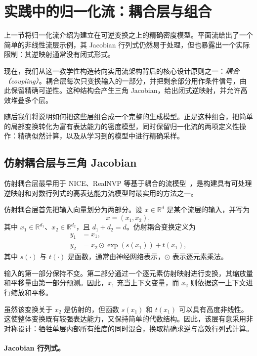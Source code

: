 \section{实践中的归一化流：耦合层与组合}

上一节将归一化流介绍为建立在可逆变换之上的精确密度模型。平面流给出了一个简单的非线性流层示例，其 Jacobian 行列式仍然易于处理，但也暴露出一个实际限制：其逆映射通常没有闭式形式。

现在，我们从这一教学性构造转向实用流架构背后的核心设计原则之一：\emph{耦合（coupling）}。耦合层每次只变换输入的一部分，并把剩余部分用作条件信号，由此保留精确可逆性。这种结构会产生三角 Jacobian，给出闭式逆映射，并允许高效堆叠多个层。

随后我们将说明如何把这些层组合成一个完整的生成模型。正是这种组合，把简单的局部变换转化为富有表达能力的密度模型，同时保留归一化流的两项定义性操作：精确似然计算，以及从学习到的模型中进行精确采样。

\subsection{仿射耦合层与三角 Jacobian}

仿射耦合层最早用于 NICE、RealNVP 等基于耦合的流模型~\cite{dinh2014nice,dinh2017density}，是构建具有可处理逆映射和对数行列式的高表达能力流模型时最实用的方法之一。

仿射耦合层首先把输入向量划分为两部分。设 $x\in\mathbb{R}^d$ 是某个流层的输入，并写为
\[
x=(x_1,x_2),
\]
其中 $x_1\in\mathbb{R}^{d_1}$、$x_2\in\mathbb{R}^{d_2}$，且 $d_1+d_2=d$。仿射耦合变换定义为
\[
\begin{aligned}
y_1 &= x_1,\\
y_2 &= x_2\odot \exp(s(x_1)) + t(x_1),
\end{aligned}
\]
其中 $s(\cdot)$ 与 $t(\cdot)$ 是函数，通常由神经网络表示，$\odot$ 表示逐元素乘法。

输入的第一部分保持不变。第二部分通过一个逐元素仿射映射进行变换，其缩放量和平移量由第一部分预测。因此，$x_1$ 充当上下文变量，而 $x_2$ 则依据这一上下文进行缩放和平移。

虽然该变换关于 $x_2$ 是仿射的，但函数 $s(x_1)$ 和 $t(x_1)$ 可以具有高度非线性。这使整体变换既有较强表达能力，又保持简单的代数结构。因此，该层有意采用非对称设计：牺牲单层内部所有维度的同时混合，换取精确求逆与高效行列式计算。

\paragraph{Jacobian 行列式。}

